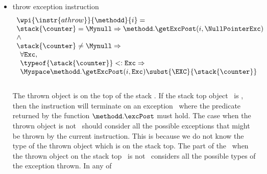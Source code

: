 \begin{itemize}
						
						
						
						
					
\item throw exception instruction \\
				
							$$ \begin{array}{l}
							          \wpi{\instr{athrow }} {\methodd}{i}  = \\
								    \stack{\counter} = \Mynull \Rightarrow  \methodd.\getExcPost( i, \NullPointerExc) \\  
								     \wedge \\
							          \stack{\counter} \neq \Mynull \Rightarrow \\
								    \begin{array}{l}  
								       \forall  \mbox{\rm\texttt{Exc}}, \\  
								        \typeof{\stack{\counter}} <: \mbox{\rm\texttt{Exc}}   \Rightarrow \\
								        \Myspace \methodd.\getExcPost( i, \mbox{\rm\texttt{Exc}}    )\subst{ \EXC }{\stack{\counter}  } 
								                     
								    \end{array} 
							   \end{array}
							$$ \\
						The thrown object is on the top of the stack \stack{\counter}.
						If the stack top object \stack{\counter} \ is \Mynull, then the instruction \athrow will terminate on an exception
						\NullPointerExc \ where the predicate returned by the function $ \methodd.\excPost$ must hold.
						The case when  the thrown object is not \Mynull \  should consider all the possible exceptions that
						might be thrown by the current instruction. This is because we do not know the type of the thrown object which is
						on the stack top.
						The part of the \fwpi \ when the thrown object on the stack top  \stack{\counter} \ is not \Mynull \ considers all the possible types
						of the exception thrown. In any of 
						

\end{itemize}
